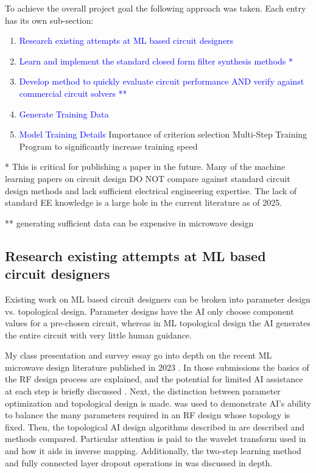 \documentclass[10pt,conference]{IEEEtran}
\begin{document}
To achieve the overall project goal the following approach was taken. Each entry has its own sub-section:
\begin{enumerate}[label=\arabic*)]
    \item \textcolor{blue}{Research existing attempts at ML based circuit designers}
    \item \textcolor{blue}{Learn and implement the standard closed form filter synthesis methods *}
    \item \textcolor{blue}{Develop method to quickly evaluate circuit performance AND verify against commercial circuit solvers **}
    \item \textcolor{blue}{Generate Training Data}
    \item \textcolor{blue}{Model Training Details}
    	\subitem Importance of criterion selection
		\subitem Multi-Step Training Program to significantly increase training speed
\end{enumerate}

* This is critical for publishing a paper in the future. Many of the machine learning papers on circuit design DO NOT compare against standard circuit design methods and lack sufficient electrical engineering expertise. The lack of standard EE knowledge is a large hole in the current literature as of 2025.

** generating sufficient data can be expensive in microwave design


\subsection{Research existing attempts at ML based circuit designers}

Existing work on ML based circuit designers can be broken into parameter design vs. topological design. Parameter designs have the AI only choose component values for a pre-chosen circuit, whereas in ML topological design the AI generates the entire circuit with very little human guidance.


My class presentation and survey essay go into depth on the recent ML microwave design literature published in 2023 . In those submissions the basics of the RF design process are explained, and the potential for limited AI assistance at each step is briefly discussed \cite{lee2024icdesign}. Next, the distinction between parameter optimization and topological design is made. \cite{xue2023mmic} was used to demonstrate AI's ability to balance the many parameters required in an RF design whose topology is fixed. Then, the topological AI design algorithms described in \cite{xu2024microwave, karahan2024rfdesign, taskiran2024annsynthesis} are described and methods compared. Particular attention is paid to the wavelet transform used in \cite{xu2024microwave} and how it aids in inverse mapping. Additionally, the two-step learning method and fully connected layer dropout operations in \cite{karahan2024rfdesign} was discussed in depth.
\end{document}
